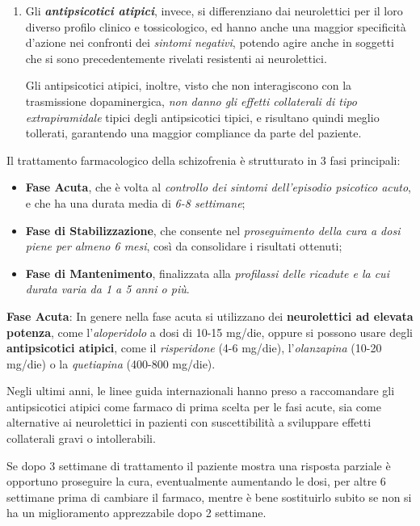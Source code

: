 \documentclass[]{article}
\begin{document}
\begin{enumerate}
\def\labelenumi{\arabic{enumi}.}
\item
  Gli \textbf{\emph{antipsicotici atipici}}, invece, si differenziano
  dai neurolettici per il loro diverso profilo clinico e tossicologico,
  ed hanno anche una maggior specificità d'azione nei confronti dei
  \emph{sintomi negativi}, potendo agire anche in soggetti che si sono
  precedentemente rivelati resistenti ai neurolettici.

  Gli antipsicotici atipici, inoltre, visto che non interagiscono con la
  trasmissione dopaminergica, \emph{non danno gli effetti collaterali di
  tipo extrapiramidale} tipici degli antipsicotici tipici, e risultano
  quindi meglio tollerati, garantendo una maggior compliance da parte
  del paziente.
\end{enumerate}

Il trattamento farmacologico della schizofrenia è strutturato in 3 fasi
principali:

\begin{itemize}
\item
  \textbf{Fase Acuta}, che è volta al \emph{controllo dei sintomi
  dell'episodio psicotico acuto}, e che ha una durata media di \emph{6-8
  settimane};
\item
  \textbf{Fase di Stabilizzazione}, che consente nel \emph{proseguimento
  della cura a dosi piene per almeno 6 mesi}, così da consolidare i
  risultati ottenuti;
\item
  \textbf{Fase di Mantenimento}, finalizzata alla \emph{profilassi delle
  ricadute e la cui durata varia da 1 a 5 anni o più}.
\end{itemize}

\textbf{Fase Acuta}: In genere nella fase acuta si utilizzano dei
\textbf{neurolettici ad elevata potenza}, come l'\emph{aloperidolo} a
dosi di 10-15 mg/die, oppure si possono usare degli
\textbf{antipsicotici atipici}, come il \emph{risperidone} (4-6 mg/die),
l'\emph{olanzapina} (10-20 mg/die) o la \emph{quetiapina} (400-800
mg/die).

Negli ultimi anni, le linee guida internazionali hanno preso a
raccomandare gli antipsicotici atipici come farmaco di prima scelta per
le fasi acute, sia come alternative ai neurolettici in pazienti con
suscettibilità a sviluppare effetti collaterali gravi o intollerabili.

Se dopo 3 settimane di trattamento il paziente mostra una risposta
parziale è opportuno proseguire la cura, eventualmente aumentando le
dosi, per altre 6 settimane prima di cambiare il farmaco, mentre è bene
sostituirlo subito se non si ha un miglioramento apprezzabile dopo 2
settimane.
\end{document}
